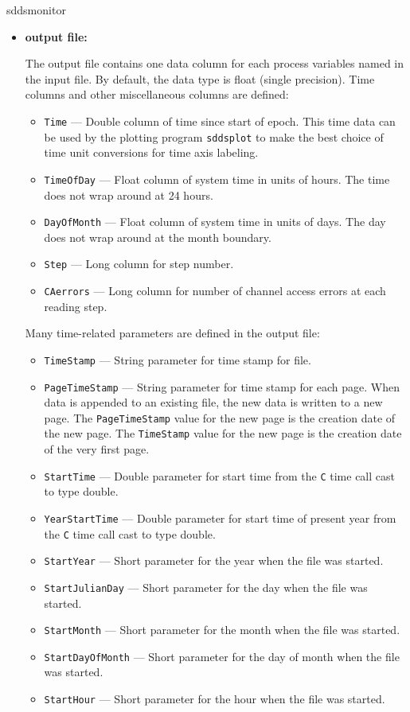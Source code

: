 \begin{sddsprog}{sddsmonitor}
\begin{itemize}
  \item \textbf{output file:}\par
The output file contains one data column for each process variables named in the input file. By default,
the data type is float (single precision).
Time columns and other miscellaneous columns are defined:
  \begin{itemize}
    \item {\tt Time} --- Double column of time since start of epoch. This time data can be used by
        the plotting program {\verb+sddsplot+} to make the best choice of time unit conversions
        for time axis labeling.
    \item {\tt TimeOfDay} --- Float column of system time in units of hours.
        The time does not wrap around at 24 hours.
    \item {\tt DayOfMonth} --- Float column of system time in units of days.
        The day does not wrap around at the month boundary.
    \item {\tt Step} --- Long column for step number.
    \item {\tt CAerrors} --- Long column for number of channel access errors at each reading step.
  \end{itemize}

Many time-related parameters are defined in the output file:
  \begin{itemize}
    \item {\tt TimeStamp} --- String parameter for time stamp for file.
    \item {\tt PageTimeStamp} --- String parameter for time stamp for each page. When data
                is appended to an existing file, the new data is written to a new
                page. The {\tt PageTimeStamp} value for the new page is the creation
                date of the new page. The {\tt TimeStamp} value for the new page is the creation
                date of the very first page.
    \item {\tt StartTime} --- Double parameter for start time from the {\tt C} time call cast to type double.
    \item {\tt YearStartTime} --- Double parameter for start time of present year from the {\tt C} time call cast to type double.
    \item {\verb+StartYear+} --- Short parameter for the year when the file was started.
    \item {\verb+StartJulianDay+} --- Short parameter for the day when the file was started.
    \item {\verb+StartMonth+} --- Short parameter for the month when the file was started.
    \item {\verb+StartDayOfMonth+} --- Short parameter for the day of month when the file was started.
    \item {\verb+StartHour+} --- Short parameter for the hour when the file was started.
  \end{itemize}
\end{itemize}


\end{sddsprog}
